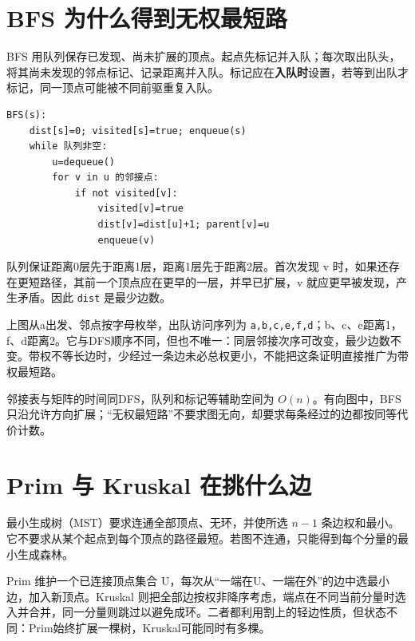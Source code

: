 \section{BFS 为什么得到无权最短路}\label{ds-06-05}

BFS 用队列保存已发现、尚未扩展的顶点。起点先标记并入队；每次取出队头，将其尚未发现的邻点标记、记录距离并入队。标记应在\textbf{入队时}设置，若等到出队才标记，同一顶点可能被不同前驱重复入队。

\par\medskip\noindent
\begin{minipage}{\linewidth}
\begin{verbatim}
BFS(s):
    dist[s]=0; visited[s]=true; enqueue(s)
    while 队列非空:
        u=dequeue()
        for v in u 的邻接点:
            if not visited[v]:
                visited[v]=true
                dist[v]=dist[u]+1; parent[v]=u
                enqueue(v)
\end{verbatim}
\end{minipage}\par\medskip

队列保证距离0层先于距离1层，距离1层先于距离2层。首次发现 v 时，如果还存在更短路径，其前一个顶点应在更早的一层，并早已扩展，v 就应更早被发现，产生矛盾。因此 \allowbreak{}\texttt{dist} 是最少边数。

上图从a出发、邻点按字母枚举，出队访问序列为 \allowbreak{}\texttt{a,}\allowbreak{}\texttt{b,}\allowbreak{}\texttt{c,}\allowbreak{}\texttt{e,}\allowbreak{}\texttt{f,}\allowbreak{}\texttt{d}；b、c、e距离1，f、d距离2。它与DFS顺序不同，但也不唯一：同层邻接次序可改变，最少边数不变。带权不等长边时，少经过一条边未必总权更小，不能把这条证明直接推广为带权最短路。

邻接表与矩阵的时间同DFS，队列和标记等辅助空间为 \(O(n)\)。有向图中，BFS只沿允许方向扩展；``无权最短路''不要求图无向，却要求每条经过的边都按同等代价计数。

\section{Prim 与 Kruskal 在挑什么边}\label{ds-06-06}

最小生成树（MST）要求连通全部顶点、无环，并使所选 \(n-1\) 条边权和最小。它不要求从某个起点到每个顶点的路径最短。若图不连通，只能得到每个分量的最小生成森林。

Prim 维护一个已连接顶点集合 U，每次从``一端在U、一端在外''的边中选最小边，加入新顶点。Kruskal 则把全部边按权非降序考虑，端点在不同当前分量时选入并合并，同一分量则跳过以避免成环。二者都利用割上的轻边性质，但状态不同：Prim始终扩展一棵树，Kruskal可能同时有多棵。

